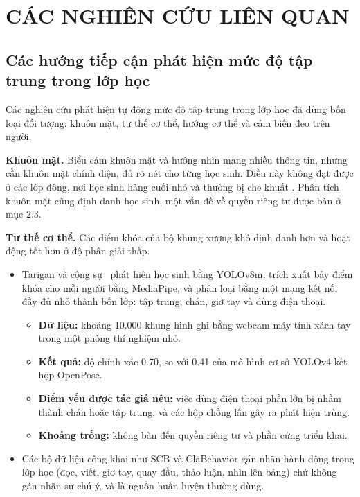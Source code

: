 \chapter{CÁC NGHIÊN CỨU LIÊN QUAN}

\section{Các hướng tiếp cận phát hiện mức độ tập trung trong lớp học}

Các nghiên cứu phát hiện tự động mức độ tập trung trong lớp học đã dùng bốn loại đối tượng: khuôn mặt, tư thế cơ thể, hướng cơ thể và cảm biến đeo trên người.

\textbf{Khuôn mặt.} Biểu cảm khuôn mặt và hướng nhìn mang nhiều thông tin, nhưng cần khuôn mặt chính diện, đủ rõ nét cho từng học sinh. Điều này không đạt được ở các lớp đông, nơi học sinh hàng cuối nhỏ và thường bị che khuất \cite{b1}. Phân tích khuôn mặt cũng định danh học sinh, một vấn đề về quyền riêng tư được bàn ở mục 2.3.

\textbf{Tư thế cơ thể.} Các điểm khóa của bộ khung xương khó định danh hơn và hoạt động tốt hơn ở độ phân giải thấp.

\begin{itemize}
\tightlist
\item
  Tarigan và cộng sự~\cite{b2} phát hiện học sinh bằng YOLOv8m, trích xuất bảy điểm khóa cho mỗi người bằng MediaPipe, và phân loại bằng một mạng kết nối đầy đủ nhỏ thành bốn lớp: tập trung, chán, giơ tay và dùng điện thoại.

  \begin{itemize}
  \tightlist
  \item
    \textbf{Dữ liệu:} khoảng 10.000 khung hình ghi bằng webcam máy tính xách tay trong một phòng thí nghiệm nhỏ.
  \item
    \textbf{Kết quả:} độ chính xác 0.70, so với 0.41 của mô hình cơ sở YOLOv4 kết hợp OpenPose.
  \item
    \textbf{Điểm yếu được tác giả nêu:} việc dùng điện thoại phần lớn bị nhầm thành chán hoặc tập trung, và các hộp chồng lấn gây ra phát hiện trùng.
  \item
    \textbf{Khoảng trống:} không bàn đến quyền riêng tư và phần cứng triển khai.
  \end{itemize}
\item
  Các bộ dữ liệu công khai như SCB \cite{b3} và ClaBehavior \cite{b28} gán nhãn hành động trong lớp học (đọc, viết, giơ tay, quay đầu, thảo luận, nhìn lên bảng) chứ không gán nhãn sự chú ý, và là nguồn huấn luyện thường dùng.
\end{itemize}

